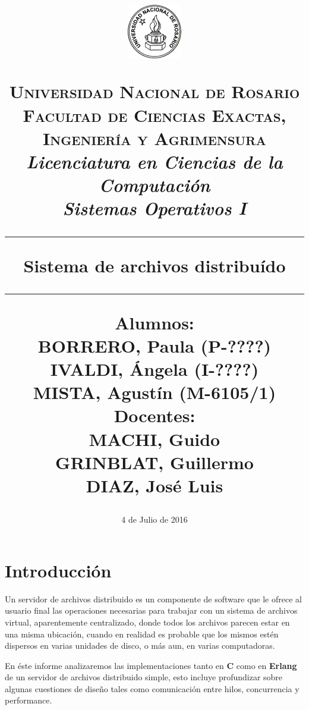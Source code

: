 \documentclass[a4paper,12pt]{article}
\title{
	\begin{figure}[!h]
		\centering
		\includegraphics[scale=1]{unr.png}
		\label{}
	\end{figure}
	\normalsize
		\textsc{Universidad Nacional de Rosario}\\	
		\textsc{Facultad de Ciencias Exactas, Ingeniería y Agrimensura}\\
		\textit{Licenciatura en Ciencias de la Computación}\\
		\textit{Sistemas Operativos I}\\
	\vspace{30pt}
	\hrule{}
	\vspace{15pt}
	\huge
		\textbf{Sistema de archivos distribuído}\\
	\vspace{15pt}
	\hrule{}
	\vspace{30pt}
	\begin{multicols}{2}
	\raggedright
		\large
			\textbf{Alumnos:}\\
		\normalsize
			BORRERO, Paula (P-????)\\
			IVALDI, Ángela (I-????)\\
			MISTA, Agustín (M-6105/1) \\
	\raggedleft
		\large
			\textbf{Docentes:}\\
		\normalsize
			MACHI, Guido\\
			GRINBLAT, Guillermo\\
			DIAZ, José Luis\\
	\end{multicols}
}
\begin{document}
\date{4 de Julio de 2016}
\maketitle

\pagebreak
\section*{Introducción}
	
	Un servidor de archivos distribuido es un componente de software que le ofrece al usuario final las operaciones necesarias para trabajar con un sistema de archivos virtual, aparentemente centralizado, donde todos los archivos parecen estar en una misma ubicación, cuando en realidad es probable que los mismos estén dispersos en varias unidades de disco, o más aun, en varias computadoras.
	
	En éste informe analizaremos las implementaciones tanto en \textbf{C}  como en \textbf{Erlang} de un servidor de archivos distribuido simple, esto incluye profundizar sobre algunas cuestiones de diseño tales como comunicación entre hilos, concurrencia y performance.
	
	
\end{document}
